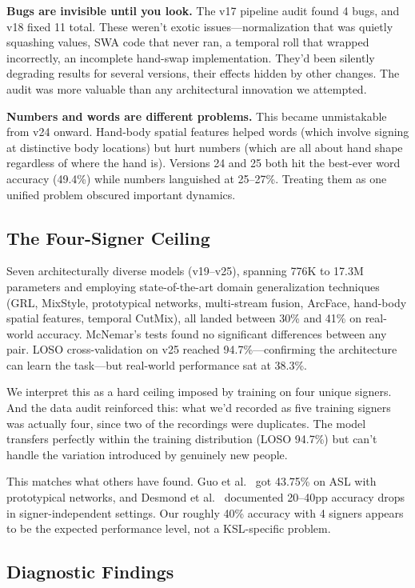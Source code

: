 \documentclass[conference]{IEEEtran}
\begin{document}
\textbf{Bugs are invisible until you look.} The v17 pipeline audit found 4 bugs, and v18 fixed 11 total. These weren't exotic issues---normalization that was quietly squashing values, SWA code that never ran, a temporal roll that wrapped incorrectly, an incomplete hand-swap implementation. They'd been silently degrading results for several versions, their effects hidden by other changes. The audit was more valuable than any architectural innovation we attempted.

\textbf{Numbers and words are different problems.} This became unmistakable from v24 onward. Hand-body spatial features helped words (which involve signing at distinctive body locations) but hurt numbers (which are all about hand shape regardless of where the hand is). Versions 24 and 25 both hit the best-ever word accuracy (49.4\%) while numbers languished at 25--27\%. Treating them as one unified problem obscured important dynamics.

\subsection{The Four-Signer Ceiling}

Seven architecturally diverse models (v19--v25), spanning 776K to 17.3M parameters and employing state-of-the-art domain generalization techniques (GRL, MixStyle, prototypical networks, multi-stream fusion, ArcFace, hand-body spatial features, temporal CutMix), all landed between 30\% and 41\% on real-world accuracy. McNemar's tests found no significant differences between any pair. LOSO cross-validation on v25 reached 94.7\%---confirming the architecture can learn the task---but real-world performance sat at 38.3\%.

We interpret this as a hard ceiling imposed by training on four unique signers. And the data audit reinforced this: what we'd recorded as five training signers was actually four, since two of the recordings were duplicates. The model transfers perfectly within the training distribution (LOSO 94.7\%) but can't handle the variation introduced by genuinely new people.

This matches what others have found. Guo et al.~\cite{guo2024fewshot} got 43.75\% on ASL with prototypical networks, and Desmond et al.~\cite{desmond2024} documented 20--40pp accuracy drops in signer-independent settings. Our roughly 40\% accuracy with 4 signers appears to be the expected performance level, not a KSL-specific problem.

\subsection{Diagnostic Findings}
\end{document}
